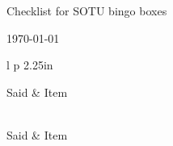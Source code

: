 \documentclass[12pt]{article}
\newcommand{\sep}{1mm}
\newcommand{\negsep}{-3mm}
\begin{document}
\begin{center}
\begin{Large}
Checklist for SOTU bingo boxes
\end{Large}
\vspace{0.15in}



\today

\end{center}

\begin{longtable}{l p {2.25in} }

Said  & Item \\[\sep]
\hline\\[\negsep]
\endfirsthead

Said  & Item \\[\sep]
\hline\\[\negsep]
\endhead

\hline\hline
\endfoot



\end{longtable}
\end{document}

